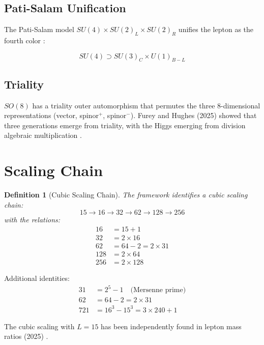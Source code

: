\documentclass[11pt]{article}
\newtheorem{definition}{Definition}
\begin{document}
\subsection{Pati-Salam Unification}

The Pati-Salam model $SU(4) \times SU(2)_L \times SU(2)_R$ unifies the lepton as the fourth color \cite{pati1974unity}:

\begin{equation}
SU(4) \supset SU(3)_C \times U(1)_{B-L}
\end{equation}

\subsection{Triality}

$SO(8)$ has a triality outer automorphism that permutes the three 8-dimensional representations (vector, spinor$^+$, spinor$^-$). Furey and Hughes (2025) showed that three generations emerge from triality, with the Higgs emerging from division algebraic multiplication \cite{furey2025generations}.

\section{Scaling Chain}

\begin{definition}[Cubic Scaling Chain]
The framework identifies a cubic scaling chain:
\begin{equation}
15 \to 16 \to 32 \to 62 \to 128 \to 256
\end{equation}
with the relations:
\begin{align}
16 &= 15 + 1 \\
32 &= 2 \times 16 \\
62 &= 64 - 2 = 2 \times 31 \\
128 &= 2 \times 64 \\
256 &= 2 \times 128
\end{align}
\end{definition}

Additional identities:
\begin{align}
31 &= 2^5 - 1 \quad \text{(Mersenne prime)} \\
62 &= 64 - 2 = 2 \times 31 \\
721 &= 16^3 - 15^3 = 3 \times 240 + 1
\end{align}

The cubic scaling with $L = 15$ has been independently found in lepton mass ratios (2025) \cite{cubicscaling2025}.
\end{document}
